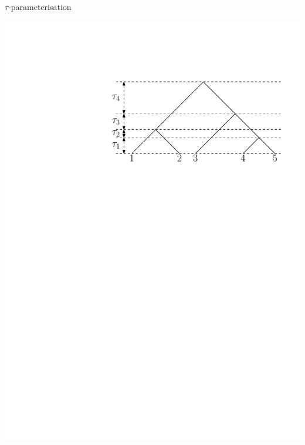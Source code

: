 \documentclass{beamer}
\theoremstyle{example}
\begin{document}
\begin{frame}{$\tau$-parameterisation}
\begin{definition}
\includegraphics[width=\framewidth]{T5}
\end{definition}
\end{frame}
\end{document}
